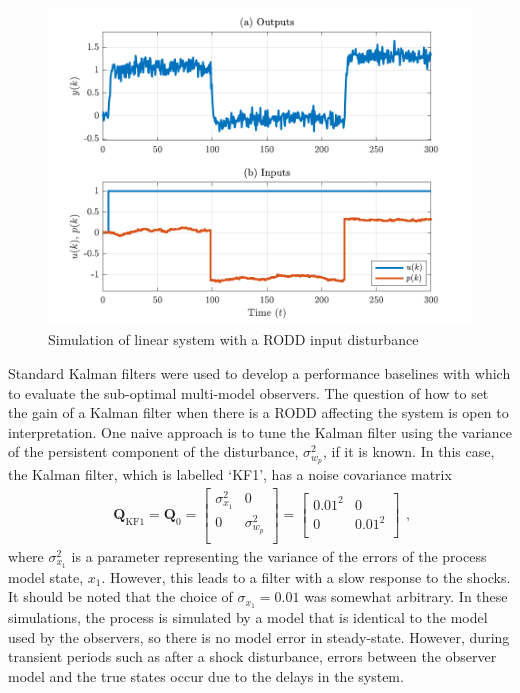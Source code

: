 \begin{figure}[htp]
	\centering
	\includegraphics[width=13cm]{images/rod_obs_sim1_ioplot.pdf}
	\caption{Simulation of linear system with a RODD input disturbance}
	\label{fig:rod-obs-sim1-ioplot}
\end{figure}
Standard Kalman filters were used to develop a performance baselines with which to evaluate the sub-optimal multi-model observers. The question of how to set the gain of a Kalman filter when there is a RODD affecting the system is open to interpretation. One naive approach is to tune the Kalman filter using the variance of the persistent component of the disturbance, $\sigma_{w_p}^2$, if it is known. In this case, the Kalman filter, which is labelled `KF1', has a noise covariance matrix
\begin{equation} \label{eq:sim-sys-siso-KF1-Q}
	\begin{aligned}
		\mathbf{Q}_{\text{KF1}}=\mathbf{Q}_0=\begin{bmatrix}
			\sigma_{x_1}^2 & 0 \\
			0 &  \sigma_{w_p}^2 \\
		\end{bmatrix}=\begin{bmatrix}
		0.01^2 & 0 \\
		0 & 0.01^2 \\
	\end{bmatrix}
	\end{aligned},
\end{equation}
where $\sigma_{x_1}^2$ is a parameter representing the variance of the errors of the process model state, $x_1$. However, this leads to a filter with a slow response to the shocks. It should be noted that the choice of $\sigma_{x_1}=0.01$ was somewhat arbitrary. In these simulations, the process is simulated by a model that is identical to the model used by the observers, so there is no model error in steady-state. However, during transient periods such as after a shock disturbance, errors between the observer model and the true states occur due to the delays in the system.

